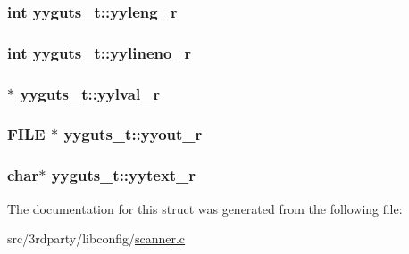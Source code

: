 \hypertarget{structyyguts__t_aba739bc731f0e9cbb0b6bdfca7930ebd}{
\subsubsection[{yyleng\-\_\-r}]{\setlength{\rightskip}{0pt plus 5cm}int yyguts\-\_\-t\-::yyleng\-\_\-r}}\label{structyyguts__t_aba739bc731f0e9cbb0b6bdfca7930ebd}
\hypertarget{structyyguts__t_aa9f13776b8d311e847cc7d974d49af4c}{
\subsubsection[{yylineno\-\_\-r}]{\setlength{\rightskip}{0pt plus 5cm}int yyguts\-\_\-t\-::yylineno\-\_\-r}}\label{structyyguts__t_aa9f13776b8d311e847cc7d974d49af4c}
\hypertarget{structyyguts__t_a55dbdcd46a36d34adcbfc29be44d10cf}{
\subsubsection[{yylval\-\_\-r}]{$\ast$ yyguts\-\_\-t\-::yylval\-\_\-r}}\label{structyyguts__t_a55dbdcd46a36d34adcbfc29be44d10cf}
\hypertarget{structyyguts__t_a436368a905aaf12e809e265749c74031}{
\subsubsection[{yyout\-\_\-r}]{\setlength{\rightskip}{0pt plus 5cm}F\-I\-L\-E $\ast$ yyguts\-\_\-t\-::yyout\-\_\-r}}\label{structyyguts__t_a436368a905aaf12e809e265749c74031}
\hypertarget{structyyguts__t_aebaa731ad6cbe2411d104925e5bb3f2c}{
\subsubsection[{yytext\-\_\-r}]{\setlength{\rightskip}{0pt plus 5cm}char$\ast$ yyguts\-\_\-t\-::yytext\-\_\-r}}\label{structyyguts__t_aebaa731ad6cbe2411d104925e5bb3f2c}


The documentation for this struct was generated from the following file\-:\begin{DoxyCompactItemize}
\item 
src/3rdparty/libconfig/\hyperlink{scanner_8c}{scanner.\-c}\end{DoxyCompactItemize}
